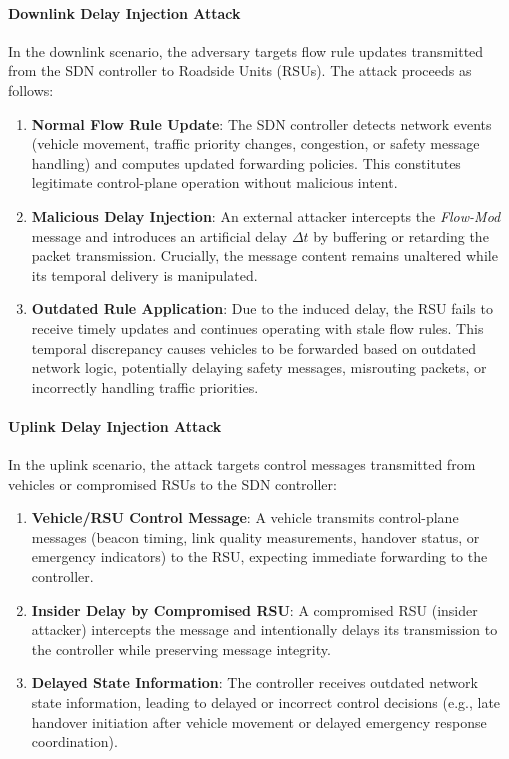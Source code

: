 \paragraph{Downlink Delay Injection Attack}
In the downlink scenario, the adversary targets flow rule updates transmitted from the SDN controller to Roadside Units (RSUs). The attack proceeds as follows:

\begin{enumerate}
    \item \textbf{Normal Flow Rule Update}: The SDN controller detects network events (vehicle movement, traffic priority changes, congestion, or safety message handling) and computes updated forwarding policies. This constitutes legitimate control-plane operation without malicious intent.
    
    \item \textbf{Malicious Delay Injection}: An external attacker intercepts the \textit{Flow-Mod} message and introduces an artificial delay $\Delta t$ by buffering or retarding the packet transmission. Crucially, the message content remains unaltered while its temporal delivery is manipulated.
    
    \item \textbf{Outdated Rule Application}: Due to the induced delay, the RSU fails to receive timely updates and continues operating with stale flow rules. This temporal discrepancy causes vehicles to be forwarded based on outdated network logic, potentially delaying safety messages, misrouting packets, or incorrectly handling traffic priorities.
\end{enumerate}

\paragraph{Uplink Delay Injection Attack}
In the uplink scenario, the attack targets control messages transmitted from vehicles or compromised RSUs to the SDN controller:

\begin{enumerate}
    \item \textbf{Vehicle/RSU Control Message}: A vehicle transmits control-plane messages (beacon timing, link quality measurements, handover status, or emergency indicators) to the RSU, expecting immediate forwarding to the controller.
    
    \item \textbf{Insider Delay by Compromised RSU}: A compromised RSU (insider attacker) intercepts the message and intentionally delays its transmission to the controller while preserving message integrity.
    
    \item \textbf{Delayed State Information}: The controller receives outdated network state information, leading to delayed or incorrect control decisions (e.g., late handover initiation after vehicle movement or delayed emergency response coordination).
\end{enumerate}

